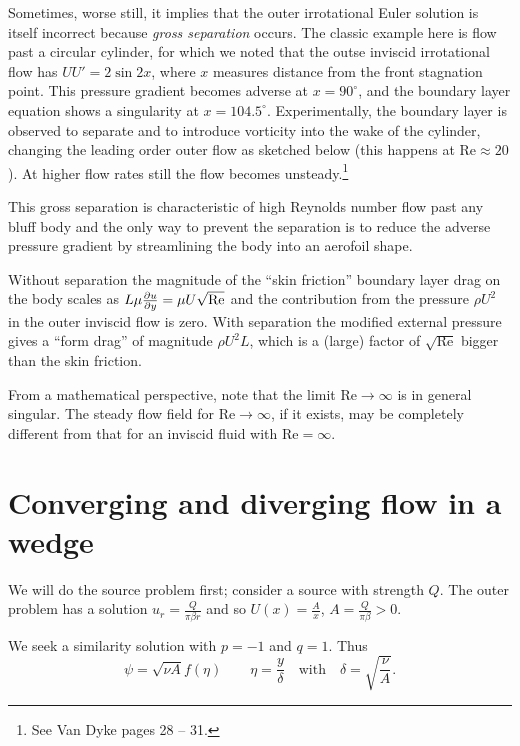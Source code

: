 \documentclass{notes}
\newcommand{\Rey}{\mathrm{Re}}
\theoremstyle{plain}
\begin{document}
Sometimes, worse still, it implies that the outer irrotational Euler
solution is itself incorrect because \emph{gross separation} occurs.  The
classic example here is flow past a circular cylinder, for which we
noted that the outse inviscid irrotational flow has $U U' = 2 \sin 2 x$,
where $x$ measures distance from the front stagnation point.  This
pressure gradient becomes adverse at $x = 90^\circ$, and the boundary
layer equation shows a singularity at $x= 104.5^\circ$.  Experimentally,
the boundary layer is observed to separate and to introduce vorticity into
the wake of the cylinder, changing the leading order outer flow as
sketched below (this happens at $\Rey \approx 20$).  At higher flow rates
still the flow becomes unsteady.\footnote{See Van Dyke pages 28 -- 31.}

\vspace{1in}

This gross separation is characteristic of high Reynolds number flow past
any bluff body and the only way to prevent the separation is to reduce
the adverse pressure gradient by streamlining the body into an aerofoil
shape.

Without separation the magnitude of the ``skin friction'' boundary layer
drag on the body scales as $L \mu \pd{u}{y} = \mu U \sqrt{\Rey}$ and
the contribution from the pressure $\rho U^2$ in the outer inviscid flow
is zero.  With separation the modified external pressure gives a
``form drag'' of magnitude $\rho U^2 L$, which is a (large) factor
of $\sqrt{\Rey}$ bigger than the skin friction.

From a mathematical perspective, note that the limit $\Rey \to \infty$
is in general singular.  The steady flow field for $\Rey \to \infty$, if
it exists, may be completely different from that for an inviscid fluid
with $\Rey = \infty$.

\section{Converging and diverging flow in a wedge}

\vspace{1in}

We will do the source problem first; consider a source with strength
$Q$.  The outer problem has a solution $u_r = \frac{Q}{\pi \beta r}$
and so $U(x) = \frac{A}{x}$, $A = \frac{Q}{\pi \beta} > 0$.

We seek a similarity solution with $p = -1$ and $q = 1$.  Thus
\[
\psi = \sqrt{\nu A} f(\eta) \qquad \eta = \frac{y}{\delta} \quad \text{with}
\quad \delta = \sqrt{\frac{\nu}{A}}.
\]
\end{document}
